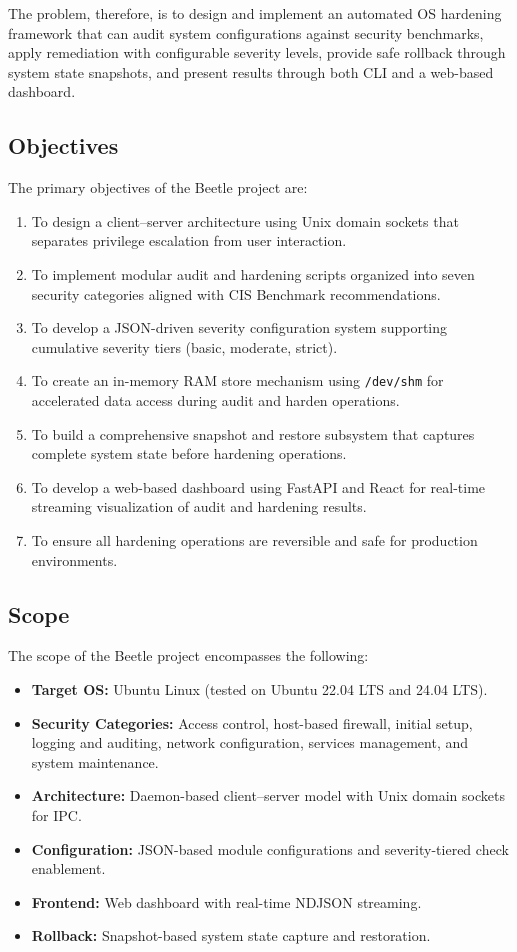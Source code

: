 The problem, therefore, is to design and implement an automated OS hardening framework that can audit system configurations against security benchmarks, apply remediation with configurable severity levels, provide safe rollback through system state snapshots, and present results through both CLI and a web-based dashboard.

\subsection{Objectives}

The primary objectives of the Beetle project are:

\begin{enumerate}[noitemsep]
    \item To design a client--server architecture using Unix domain sockets that separates privilege escalation from user interaction.
    \item To implement modular audit and hardening scripts organized into seven security categories aligned with CIS Benchmark recommendations.
    \item To develop a JSON-driven severity configuration system supporting cumulative severity tiers (basic, moderate, strict).
    \item To create an in-memory RAM store mechanism using \texttt{/dev/shm} for accelerated data access during audit and harden operations.
    \item To build a comprehensive snapshot and restore subsystem that captures complete system state before hardening operations.
    \item To develop a web-based dashboard using FastAPI and React for real-time streaming visualization of audit and hardening results.
    \item To ensure all hardening operations are reversible and safe for production environments.
\end{enumerate}

\subsection{Scope}

The scope of the Beetle project encompasses the following:

\begin{itemize}[noitemsep]
    \item \textbf{Target OS:} Ubuntu Linux (tested on Ubuntu 22.04 LTS and 24.04 LTS).
    \item \textbf{Security Categories:} Access control, host-based firewall, initial setup, logging and auditing, network configuration, services management, and system maintenance.
    \item \textbf{Architecture:} Daemon-based client--server model with Unix domain sockets for IPC.
    \item \textbf{Configuration:} JSON-based module configurations and severity-tiered check enablement.
    \item \textbf{Frontend:} Web dashboard with real-time NDJSON streaming.
    \item \textbf{Rollback:} Snapshot-based system state capture and restoration.
\end{itemize}

